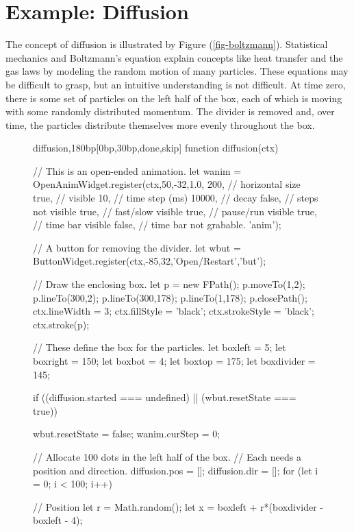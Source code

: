 \documentclass[10pt]{article}
\begin{document}
\section{Example: Diffusion}

The concept of diffusion is illustrated by Figure
(\ref{fig-boltzmann}). Statistical mechanics and Boltzmann's equation
explain concepts like heat transfer and the gas laws by modeling the
random motion of many particles. These equations may be difficult to grasp,
but an intuitive understanding is not difficult. At time zero, there
is some set of particles on the left half of the box, each of which is
moving with some randomly distributed momentum. The divider is removed
and, over time, the particles distribute themselves more evenly
throughout the box.  

\begin{figure}
\begin{figput}{diffusion,180bp}[0bp,30bp,done,skip]
function diffusion(ctx) {
  
  // This is an open-ended animation.
  let wanim = OpenAnimWidget.register(ctx,50,-32,1.0,
    200, // horizontal size
    true, // visible
    10, // time step (ms)
    10000, // decay
    false, // steps not visible
    true, // fast/slow visible
    true, // pause/run visible
    true, // time bar visible
    false, // time bar not grabable.
    'anim');

  // A button for removing the divider.
  let wbut = ButtonWidget.register(ctx,-85,32,'Open/Restart','but');

  // Draw the enclosing box.
  let p = new FPath();
  p.moveTo(1,2);
  p.lineTo(300,2);
  p.lineTo(300,178);
  p.lineTo(1,178);
  p.closePath();
  ctx.lineWidth = 3;
  ctx.fillStyle = 'black';
  ctx.strokeStyle = 'black';
  ctx.stroke(p);

  // These define the box for the particles.
  let boxleft = 5;
  let boxright = 150;
  let boxbot = 4;
  let boxtop = 175;
  let boxdivider = 145;

  if ((diffusion.started === undefined) || (wbut.resetState === true))
    {
      wbut.resetState = false;
      wanim.curStep = 0;
      
      // Allocate 100 dots in the left half of the box.
      // Each needs a position and direction.
      diffusion.pos = [];
      diffusion.dir = [];
      for (let i = 0; i < 100; i++)
        {
          // Position
          let r = Math.random();
          let x = boxleft + r*(boxdivider - boxleft - 4);

}}}
\end{figput}
\end{figure}
\end{document}
